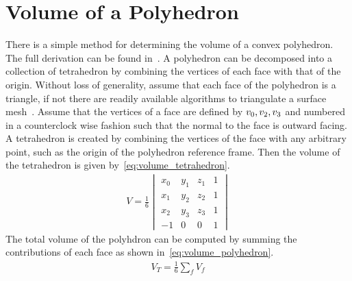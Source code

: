 
\chapter{Volume of a Polyhedron}\label{sec:polyhedron_volume}

There is a simple method for determining the volume of a convex polyhedron.
The full derivation can be found in~\textcite{newson1899,orourke1998}.
A polyhedron can be decomposed into a collection of tetrahedron by combining the vertices of each face with that of the origin.
Without loss of generality, assume that each face of the polyhedron is a triangle, if not there are readily available algorithms to triangulate a surface mesh~\cite{berg2008}.
Assume that the vertices of a face are defined by \( v_0, v_2, v_3 \) and numbered in a counterclock wise fashion such that the normal to the face is outward facing.
A tetrahedron is created by combining the vertices of the face with any arbitrary point, such as the origin of the polyhedron reference frame.
Then the volume of the tetrahedron is given by~\cref{eq:volume_tetrahedron}.
\begin{align}\label{eq:volume_tetrahedron}
    V = \frac{1}{6} 
    \begin{vmatrix} 
        x_0 & y_1 & z_1 & 1 \\
        x_1 & y_2 & z_2 & 1 \\
        x_2 & y_3 & z_3 & 1 \\
        -1 & 0 & 0 & 1
    \end{vmatrix}
\end{align}
The total volume of the polyhdron can be computed by summing the contributions of each face as shown in~\cref{eq:volume_polyhedron}.
\begin{align}\label{eq:volume_polyhedron}
    V_T = \frac{1}{6} \sum_{f} V_f
\end{align}
